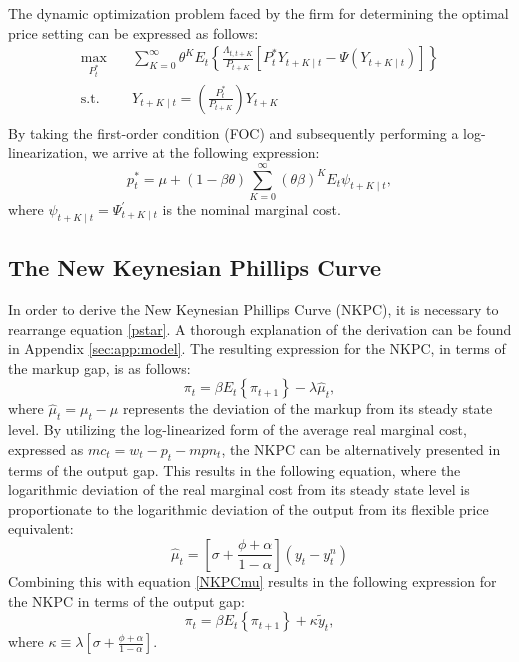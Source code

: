 \documentclass[11pt, a4paper, leqno]{article}
\begin{document}
The dynamic optimization problem faced by the firm for determining the optimal price setting can be expressed as follows:
\begin{equation}
	\begin{aligned}
	\max_{P^{*}_{t}}  \quad & \sum_{K=0}^{\infty} \theta^{K} E_{t} \left\{ \frac{\Lambda_{t,t+K}}{P_{t+K}} \left[ P_{t}^{*} Y_{t+K \mid t} - \Psi \left( Y_{t+K \mid t} \right) \right] \right\} \\
	\textrm{s.t.} \quad & Y_{t+K \mid t} = \left( \frac{P^{*}_{t}}{P_{t+K}} \right) Y_{t+K} \\
	\end{aligned}
\end{equation}
By taking the first-order condition (FOC) and subsequently performing a log-linearization, we arrive at the following expression:
\begin{equation} \label{pstar}
	p^{*}_{t} = \mu + \left(1-\beta \theta \right) \sum_{K=0}^{\infty} \left(\theta \beta \right)^{K} E_{t} \psi_{t+K \mid t},
\end{equation}
where $\psi_{t+K \mid t}=\Psi^{'}_{t+K \mid t}$ is the nominal marginal cost.
\subsection{The New Keynesian Phillips Curve}
In order to derive the New Keynesian Phillips Curve (NKPC), it is necessary to rearrange equation \ref{pstar}. A thorough explanation of the derivation can be found in Appendix \ref{sec:app:model}. The resulting expression for the NKPC, in terms of the markup gap, is as follows:
\begin{equation} \label{NKPCmu}
	\pi_{t} = \beta E_{t} \left\{ \pi_{t+1} \right\} - \lambda \hat{\mu}_{t},
\end{equation}
where $\hat{\mu}_{t}= \mu_{t}-\mu$ represents the deviation of the markup from its steady state level. By utilizing the log-linearized form of the average real marginal cost, expressed as $mc_{t} = w_{t} - p_{t} - mpn_{t} $, the NKPC can be alternatively presented in terms of the output gap. This results in the following equation, where the logarithmic deviation of the real marginal cost from its steady state level is proportionate to the logarithmic deviation of the output from its flexible price equivalent:
\begin{equation}
	\hat{\mu}_{t}= \left[ \sigma + \frac{\phi + \alpha}{1- \alpha} \right] \left( y_{t} - y_{t}^{n} \right)
\end{equation}
Combining this with equation \ref{NKPCmu} results in the following expression for the NKPC in terms of the output gap:
\begin{equation}  \label{NKPCygap}
	\pi_{t} = \beta E_{t} \left\{ \pi_{t+1} \right\} + \kappa \widetilde{y}_{t},
\end{equation}
where $\kappa \equiv \lambda \left[ \sigma + \frac{\phi + \alpha}{1- \alpha} \right] $.
\end{document}
